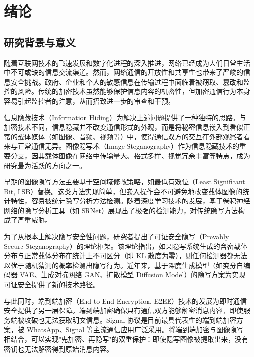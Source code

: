 \section{绪论}\label{chap:introduction}

\subsection{研究背景与意义}

随着互联网技术的飞速发展和数字化进程的深入推进，网络已经成为人们日常生活中不可或缺的信息交流渠道。然而，网络通信的开放性和共享性也带来了严峻的信息安全挑战。政府、企业和个人的敏感信息在传输过程中面临着被窃取、篡改和监控的风险\supercite{fridrich2009steganography}。传统的加密技术虽然能够保护信息内容的机密性，但加密通信行为本身容易引起监控者的注意，从而招致进一步的审查和干预。

信息隐藏技术（Information Hiding）为解决上述问题提供了一种独特的思路。与加密技术不同，信息隐藏并不改变通信形式的外观，而是将秘密信息嵌入到看似正常的载体媒体（如图像、音频、视频等）中，使得通信双方的交互在外部观察者看来与正常通信无异\supercite{katzenbeisser2000information}。图像隐写术（Image Steganography）作为信息隐藏技术的重要分支，因其载体图像在网络中传输量大、格式多样、视觉冗余丰富等特点，成为研究最为活跃的方向之一。

早期的图像隐写方法主要基于空间域修改策略，如最低有效位（Least Significant Bit, LSB）替换\supercite{chan2004hiding}。这类方法实现简单，但嵌入操作会不可避免地改变载体图像的统计特性，容易被统计隐写分析方法检测\supercite{fridrich2012rich}。随着深度学习技术的发展，基于卷积神经网络的隐写分析工具（如 SRNet\supercite{boroumand2019deep}）展现出了极强的检测能力，对传统隐写方法构成了严重威胁。

为了从根本上解决隐写安全性问题，研究者提出了可证安全隐写（Provably Secure Steganography）的理论框架\supercite{hopper2009provably}。该理论指出，如果隐写系统生成的含密载体分布与正常载体分布在统计上不可区分（即 KL 散度为零），则任何检测器都无法以优于随机猜测的概率检测出隐写行为。近年来，基于深度生成模型（如变分自编码器 VAE、生成对抗网络 GAN、扩散模型 Diffusion Model）的隐写方案为实现可证安全提供了新的技术路径\supercite{de2022perfectly}。

与此同时，端到端加密（End-to-End Encryption, E2EE）技术的发展为即时通信安全提供了另一层保障。端到端加密确保只有通信双方能够解密消息内容，即使服务端被攻破也无法获取明文信息。Signal 协议\supercite{marlinspike2016signal}是目前最具代表性的端到端加密方案，被 WhatsApp、Signal 等主流通信应用广泛采用。将端到端加密与图像隐写相结合，可以实现"先加密、再隐写"的双重保护：即使隐写图像被提取出来，没有密钥也无法解密得到原始消息内容。

